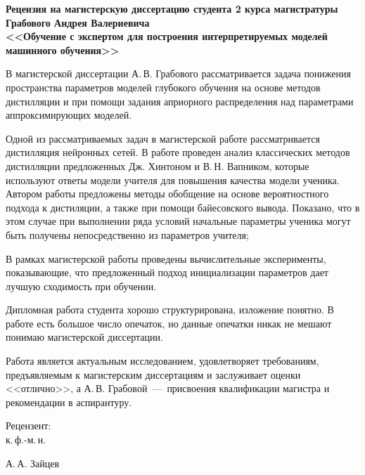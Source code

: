 \documentclass[12pt]{article}
\begin{document}
\thispagestyle{empty}
\begin{center}
\bigskip

\textbf{Рецензия на магистерскую диссертацию студента 2 курса магистратуры\\
Грабового Андрея Валериевича\\
<<Обучение с экспертом для построения интерпретируемых моделей машинного обучения>>}
\end{center}

В магистерской диссертации А.\,В. Грабового рассматривается задача понижения пространства параметров моделей глубокого обучения на основе методов дистилляции и при помощи задания априорного распределения над параметрами аппроксимирующих моделей.

Одной из рассматриваемых задач в магистерской работе рассматривается дистилляция нейронных сетей. В работе проведен анализ классических методов дистилляции предложенных Дж. Хинтоном и В.\,Н. Вапником, которые используют ответы модели учителя для повышения качества модели ученика. Автором работы предложены методы обобщение на основе вероятностного подхода к дистиляции, а также при помощи байесовского вывода. Показано, что в этом случае при выполнении ряда условий начальные параметры ученика могут быть получены непосредственно из параметров учителя;

В рамках магистерской работы проведены вычислительные эксперименты, показывающие, что предложенный подход инициализации параметров дает лучшую сходимость при обучении.

Дипломная работа студента хорошо структурирована, изложение понятно. В работе есть большое число опечаток, но данные опечатки никак не мешают понимаю магистерской диссертации.

Работа является актуальным исследованием, удовлетворяет требованиям, предъявляемым к магистерским диссертациям и заслуживает оценки <<отлично>>, а А.\,В. Грабовой~---~присвоения квалификации магистра и рекомендации в аспирантуру.


\vspace{3cm}
\begin{flushleft}
Рецензент:\\
к.\,ф.-м.\,н.\\
\end{flushleft}
\begin{flushright}
А.\,А. Зайцев
\end{flushright}
\end{document}
